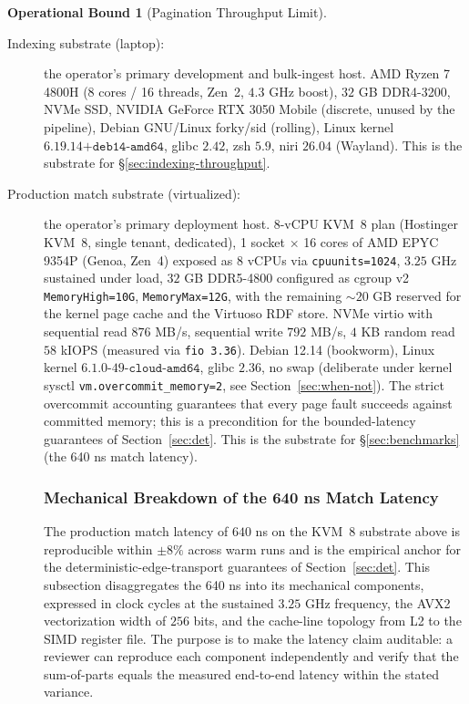\documentclass[10pt,twocolumn]{article}
\theoremstyle{definition}
\newtheorem{operationalbound}[theorem]{Operational Bound}
\theoremstyle{remark}
\begin{document}
\begin{operationalbound}[Pagination Throughput Limit]
\begin{description}
\item[Indexing substrate (laptop):] the operator's primary development
      and bulk-ingest host. AMD Ryzen 7 4800H (8 cores / 16 threads,
      Zen~2, $4.3$ GHz boost), $32$ GB DDR4-3200, NVMe SSD, NVIDIA
      GeForce RTX 3050 Mobile (discrete, unused by the pipeline),
      Debian GNU/Linux forky/sid (rolling), Linux kernel
      $6.19.14\texttt{+deb14-amd64}$, glibc $2.42$, zsh $5.9$, niri
      $26.04$ (Wayland).  This is the substrate for
      \S\ref{sec:indexing-throughput}.

\item[Production match substrate (virtualized):] the operator's primary
      deployment host. 8-vCPU KVM~8 plan (Hostinger KVM~8, single
      tenant, dedicated), 1 socket $\times$ 16 cores of AMD EPYC 9354P
      (Genoa, Zen~4) exposed as 8 vCPUs via \texttt{cpuunits=1024},
      $3.25$ GHz sustained under load, $32$ GB DDR5-4800 configured as
      cgroup v2 \texttt{MemoryHigh=10G}, \texttt{MemoryMax=12G}, with
      the remaining $\sim 20$ GB reserved for the kernel page cache
      and the Virtuoso RDF store. NVMe virtio with sequential read
      $876$ MB/s, sequential write $792$ MB/s, $4$ KB random read
      $58$ kIOPS (measured via \texttt{fio 3.36}). Debian 12.14
      (bookworm), Linux kernel $6.1.0\texttt{-}49\text{-}\texttt{cloud-amd64}$,
      glibc $2.36$, no swap (deliberate under kernel sysctl
      \texttt{vm.overcommit\_memory=2}, see
      Section~\ref{sec:when-not}). The strict overcommit accounting
      guarantees that every page fault succeeds against committed
      memory; this is a precondition for the bounded-latency
      guarantees of Section~\ref{sec:det}.  This is the substrate
      for \S\ref{sec:benchmarks} (the 640 ns match latency).

\subsubsection{Mechanical Breakdown of the 640 ns Match Latency}

The production match latency of $640$ ns on the KVM~8 substrate
above is reproducible within $\pm 8\%$ across warm runs and is the
empirical anchor for the deterministic-edge-transport guarantees
of Section~\ref{sec:det}. This subsection disaggregates the 640 ns
into its mechanical components, expressed in clock cycles at the
sustained $3.25$ GHz frequency, the AVX2 vectorization width of
$256$ bits, and the cache-line topology from L2 to the SIMD
register file. The purpose is to make the latency claim auditable:
a reviewer can reproduce each component independently and verify
that the sum-of-parts equals the measured end-to-end latency
within the stated variance.


\end{description}
\end{operationalbound}
\end{document}
